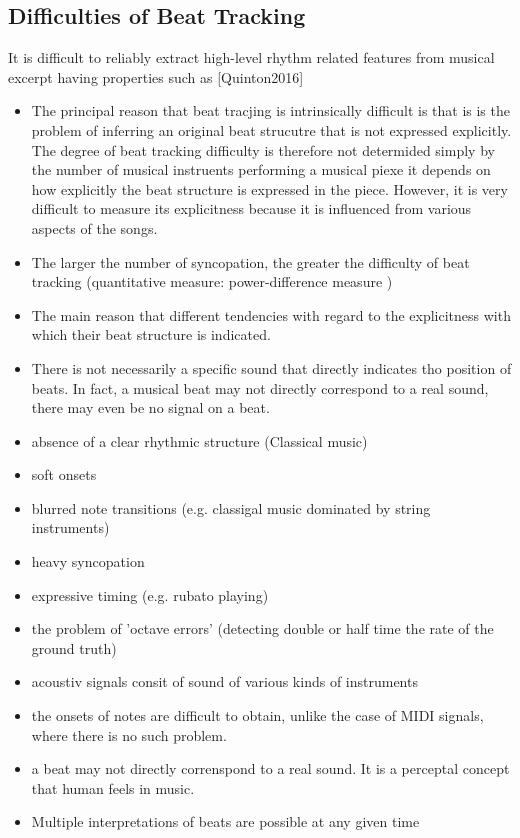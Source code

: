 \documentclass{scrartcl}
\begin{document}
\subsection{Difficulties of Beat Tracking}
It is difficult to reliably extract high-level rhythm related features from musical excerpt having properties such as [Quinton2016]
\begin{itemize}
\item The principal reason that beat tracjing is intrinsically difficult is that is is the problem of inferring an original beat strucutre that is not expressed explicitly. The degree of beat tracking difficulty is therefore not determided simply by the number of musical instruents performing a musical piexe it depends on how explicitly the beat structure is expressed in the piece. However, it is very difficult to measure its explicitness because it is influenced from various aspects of the songs.
\item The larger the number of syncopation, the greater the difficulty of beat tracking (quantitative measure: power-difference measure \cite{Goto1999})
\item The main reason that different tendencies with regard to the explicitness with which their beat structure is indicated.
\item There is not necessarily a specific sound that directly indicates tho position of beats. In fact, a musical beat may not directly correspond to a real sound, there may even be no signal on a beat. 
\item absence of a clear rhythmic structure (Classical music)
\item soft onsets
\item blurred note transitions (e.g. classigal music dominated by string instruments)
\item heavy syncopation
\item expressive timing (e.g. rubato playing)
\item the problem of 'octave errors' (detecting double or half time the rate of the ground truth)
\item acoustiv signals consit of sound of various kinds of instruments
\item the onsets of notes are difficult to obtain, unlike the case of MIDI signals, where there is no such problem.
\item a beat may not directly correnspond to a real sound. It is a perceptal concept that human feels in music. 
\item Multiple interpretations of beats are possible at any given time

\end{itemize}
\end{document}

